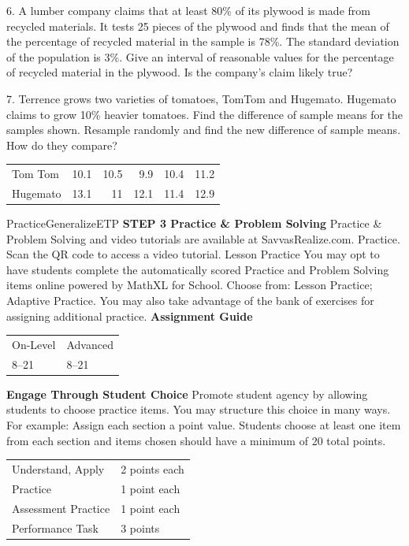 \documentclass{article}
\newenvironment{concept-summary}{}{}    %
\newenvironment{te-addendum}[2]{}{}     %
\newcommand{\answer}[1]{}               %
\begin{document}
\begin{concept-summary}
\answer{Null hypothesis: The work with the batting coach did not improve the player's batting average, (H_0:b=0.278). Alternative hypothesis: The work with the batting coach improved the player's batting average, (H_a:b>0.278).}
6. A lumber company claims that at least 80\% of its plywood is made from recycled materials. It tests 25 pieces of the plywood and finds that the mean of the percentage of recycled material in the sample is 78\%. The standard deviation of the population is 3\%. Give an interval of reasonable values for the percentage of recycled material in the plywood. Is the company's claim likely true?
\answer{76.8\% to 79.2\%; no}
7. Terrence grows two varieties of tomatoes, TomTom and Hugemato. Hugemato claims to grow 10\% heavier tomatoes. Find the difference of sample means for the samples shown. Resample randomly and find the new difference of sample means. How do they compare?
\begin{tabular}{lrrrrr}
Tom Tom & 10.1 & 10.5 & 9.9 & 10.4 & 11.2 \\
Hugemato & 13.1 & 11 & 12.1 & 11.4 & 12.9 \\
\end{tabular}
\answer{The means for the original samples are 10.42 for TomTom and 12.1 for Hugemato, with a difference of 1.68. Answers may vary; sample: After randomization, one group is \{12.1, 11, 10.4, 12.9, 10.1\} and the other is \{13.1, 11.2, 10.5, 9.9, 11.4\}. The means are 11.3 and 11.22 with a difference of 0.08. This difference is much smaller and suggests that Hugemato tomatoes may actually be larger.}
\end{concept-summary}
\begin{te-addendum}{Practice}{GeneralizeETP}
\textbf{STEP 3 Practice & Problem Solving}
Practice & Problem Solving and video tutorials are available at SavvasRealize.com. Practice. Scan the QR code to access a video tutorial.
Lesson Practice You may opt to have students complete the automatically scored Practice and Problem Solving items online powered by MathXL for School.
Choose from: Lesson Practice; Adaptive Practice.
You may also take advantage of the bank of exercises for assigning additional practice.
\textbf{Assignment Guide}
\begin{tabular}{ll}
On-Level & Advanced \\
8–21 & 8–21 \\
\end{tabular}
\textbf{Engage Through Student Choice}
Promote student agency by allowing students to choose practice items. You may structure this choice in many ways. For example:
Assign each section a point value. Students choose at least one item from each section and items chosen should have a minimum of 20 total points.
\begin{tabular}{ll}
Understand, Apply & 2 points each \\
Practice & 1 point each \\
Assessment Practice & 1 point each \\
Performance Task & 3 points \\
\end{tabular}
\end{te-addendum}
\end{document}
